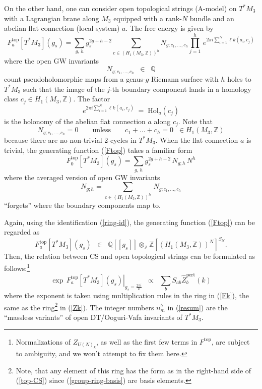 \documentclass[hyper,letterpaper]{JHEP3}
\newcommand{\Z}{{\mathbb Z}}
\newcommand{\Q}{{\mathbb Q}}
\renewcommand{\hat}{\widehat}
\def\lk{{\ell k}}
\begin{document}
On the other hand, one can consider open topological strings (A-model) on $T^*M_3$ with a Lagrangian brane along $M_3$ equipped with a rank-$N$ bundle and an abelian flat connection (local system) $a$. The free energy is given by
\begin{equation}
	F^\text{top}_a[T^*M_3](g_s)=
	\sum_{g,\, h}g_s^{2g+h-2}\sum_{c\in (H_1(M_3,\Z))^h}
	N_{g;c_1,\ldots,c_h}
	\prod_{j=1}^h\,e^{2\pi i\sum_{i=1}^N \lk (a_i,c_j)}
	\label{Ftop}
\end{equation}
where the open GW invariants
\begin{equation}
	N_{g;c_1,\ldots,c_h}\;\;\in \;\; \Q
\end{equation}
count pseudoholomorphic maps from a genus-$g$ Riemann surface with $h$ holes to $T^*M_3$ such that the image of the $j$-th boundary component lands in a homology class $c_j\in H_1(M_3,\Z)$. The factor
\begin{equation}
	e^{2\pi i\sum_{i=1}^N \lk (a_i,c_j)}\;=\;\text{Hol}_a(c_j)
\end{equation}
is the holonomy of the abelian flat connection $a$ along $c_j$. Note that
\begin{equation}
	N_{g;c_1,\ldots,c_h}=0\qquad \text{unless}\qquad c_1+\ldots+c_h= 0\;\;\in H_1(M_3,\Z)
\end{equation}
because there are no non-trivial 2-cycles in $T^*M_3$.
When the flat connection $a$ is trivial, the generating function (\ref{Ftop}) takes a familiar form
\begin{equation}
	F^\text{top}_0[T^*M_3](g_s)=
	\sum_{g,\, h}g_s^{2g+h-2}\,
	N_{g;h}\,N^{h}
\end{equation}
where the averaged version of open GW invariants
\begin{equation}
	N_{g;h}=\sum_{c\in (H_1(M_3,\Z))^h}\,N_{g;c_1,\ldots,c_h}
\end{equation}
``forgets'' where the boundary components map to.

Again, using the identification (\ref{ring-id}), the generating function (\ref{Ftop}) can be regarded as
\begin{equation}
	F^\text{top}_a[T^*M_3](g_s)\;\; \in \;\;
	\Q[[g_s]] \otimes_\Z
	\Z\left[\left(H_1(M_3,\Z)\right)^N\right]^{S_N}.
	\label{Fk}
\end{equation}
Then, the relation between CS and open topological strings can be formulated as follows:\footnote{Normalizations of $Z_{U(N)_k}$, as well as the first few terms in $F^\text{top}$, are subject to ambiguity, and we won't attempt to fix them here.}
\begin{equation}
	\left.\exp\,F^\text{top}_a[T^*M_3](g_s)\right|_{g_s=\frac{2\pi i}{k}}\;\; \propto \;\;
	\sum_{b}S_{ab}\hat{Z}_b^\text{pert}(k)
	\label{top-CS}
\end{equation}
where the exponent is taken using multiplication rules in the ring in (\ref{Fk}), the same as the ring\footnote{Note, that any element of this ring has the form as in the right-hand side of (\ref{top-CS}) since (\ref{group-ring-basis}) are basis elements.} in (\ref{Zk}). The integer numbers $n^b_m$ in (\ref{resum}) are the ``massless variants'' of open DT/Ooguri-Vafa invariants of $T^*M_3$.
\end{document}
